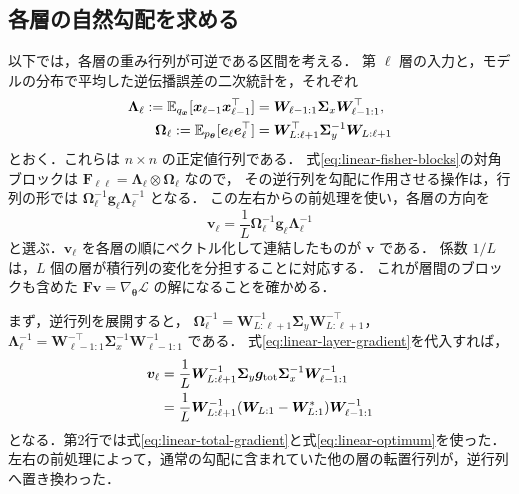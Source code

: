 \documentclass[../main.tex]{subfiles}
\begin{document}
\subsection{各層の自然勾配を求める}

以下では，各層の重み行列が可逆である区間を考える．
第 $\ell$ 層の入力と，モデルの分布で平均した逆伝播誤差の二次統計を，それぞれ
\begin{align}
  \bm{\Lambda}_\ell
  :=\mathbb{E}_{q_{\bm{x}}}
  [\bm{x}_{\ell-1}\bm{x}_{\ell-1}^\top]
  &=\bm{W}_{\ell-1:1}\bm{\Sigma}_{x}\bm{W}_{\ell-1:1}^\top,
  \notag\\
  \bm{\Omega}_\ell
  :=\mathbb{E}_{p_{\bm{\theta}}}[\bm{e}_\ell\bm{e}_\ell^\top]
  &=\bm{W}_{L:\ell+1}^\top\bm{\Sigma}_{y}^{-1}\bm{W}_{L:\ell+1}
  \label{eq:linear-layer-moments}
\end{align}
とおく．これらは $n\times n$ の正定値行列である．
式\eqref{eq:linear-fisher-blocks}の対角ブロックは
$\bm{F}_{\ell\ell}=\bm{\Lambda}_\ell\otimes\bm{\Omega}_\ell$ なので，
その逆行列を勾配に作用させる操作は，行列の形では
$\bm{\Omega}_\ell^{-1}\bm{g}_\ell\bm{\Lambda}_\ell^{-1}$ となる．
この左右からの前処理を使い，各層の方向を
\begin{equation}
  \bm{v}_\ell
  =\frac1L\bm{\Omega}_\ell^{-1}
  \bm{g}_\ell\bm{\Lambda}_\ell^{-1}
  \label{eq:linear-natural-direction}
\end{equation}
と選ぶ．$\bm{v}_\ell$ を各層の順にベクトル化して連結したものが $\bm{v}$ である．
係数 $1/L$ は，$L$ 個の層が積行列の変化を分担することに対応する．
これが層間のブロックも含めた $\bm{F}\bm{v}=\nabla_{\bm{\theta}}\mathcal{L}$ の解になることを確かめる．

まず，逆行列を展開すると，
$\bm{\Omega}_\ell^{-1}=\bm{W}_{L:\ell+1}^{-1}\bm{\Sigma}_{y}\bm{W}_{L:\ell+1}^{-\top}$，
$\bm{\Lambda}_\ell^{-1}=\bm{W}_{\ell-1:1}^{-\top}\bm{\Sigma}_{x}^{-1}\bm{W}_{\ell-1:1}^{-1}$ である．
式\eqref{eq:linear-layer-gradient}を代入すれば，
\begin{align}
  \bm{v}_\ell
  &=\frac1L\bm{W}_{L:\ell+1}^{-1}\bm{\Sigma}_{y}
  \bm{g}_{\mathrm{tot}}\bm{\Sigma}_{x}^{-1}\bm{W}_{\ell-1:1}^{-1}
  \notag\\
  &=\frac1L\bm{W}_{L:\ell+1}^{-1}
  (\bm{W}_{L:1}-\bm{W}_{L:1}^*)
  \bm{W}_{\ell-1:1}^{-1}
  \label{eq:linear-natural-cancellation}
\end{align}
となる．第2行では式\eqref{eq:linear-total-gradient}と式\eqref{eq:linear-optimum}を使った．
左右の前処理によって，通常の勾配に含まれていた他の層の転置行列が，逆行列へ置き換わった．
\end{document}
